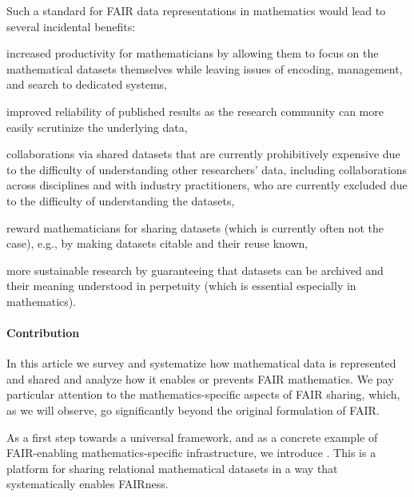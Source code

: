 Such a standard for FAIR data representations in mathematics would lead to several incidental benefits:
\begin{compactitem}
\item increased productivity for mathematicians by allowing them to focus on the mathematical datasets themselves while leaving issues of encoding, management, and search to dedicated systems,
\item improved reliability of published results as the research community can more easily scrutinize the underlying data,
\item collaborations via shared datasets that are currently prohibitively expensive due to the difficulty of understanding other researchers' data, including collaborations across disciplines and with industry practitioners, who are currently excluded due to the difficulty of understanding the datasets,
\item reward mathematicians for sharing datasets (which is currently often not the case), e.g., by making datasets citable and their reuse known,
\item more sustainable research by guaranteeing that datasets can be archived and their meaning understood in perpetuity (which is essential especially in mathematics).
\end{compactitem}

\paragraph{Contribution}
In this article we survey and systematize how mathematical data is represented and shared and analyze how it enables or prevents FAIR mathematics.
We pay particular attention to the mathematics-specific aspects of FAIR sharing, which, as we will observe, go significantly beyond the original formulation of FAIR.

As a first step towards a universal framework, and as a concrete example of FAIR-enabling mathematics-specific infrastructure, we introduce \dmh.
This is a platform for sharing relational mathematical datasets in a way that systematically enables FAIRness.

